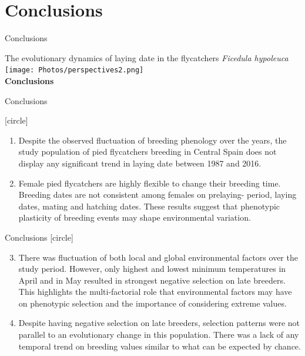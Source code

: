 \documentclass[compress]{beamer}
\begin{document}
\section{Conclusions}
\begin{frame}{Conclusions}

\centering
The evolutionary dynamics of laying date in the flycatchers \textit{Ficedula hypoleuca} \\
\vspace{0.5cm}
  \texttt{[image: Photos/perspectives2.png]} \\
\textbf{Conclusions}

\end{frame}

\begin{frame}{Conclusions}

     [circle]
 \begin{enumerate}
 \justifying
\item <1->Despite the observed fluctuation of breeding phenology over the years, the study population of pied flycatchers breeding in Central Spain does not display any significant trend in laying date between 1987 and 2016.
\vspace{0.3cm}

\item <2-> Female pied flycatchers are highly flexible to change their breeding time. Breeding dates are not consistent among females on prelaying- period, laying dates, mating and hatching dates. These results suggest that phenotypic plasticity
of breeding events may shape environmental variation.

\end{enumerate}
\end{frame}

\begin{frame}{Conclusions}
 [circle]
 \begin{enumerate}\setcounter{enumi}{2}
\item <1-> \justifying There was fluctuation of both local and global environmental factors over the study period. However, only highest and lowest minimum temperatures in April and in May resulted in strongest negative selection on late breeders.
This highlights the multi-factorial role that environmental factors may have on phenotypic selection and the importance of considering extreme values.
\vspace{0.3cm}
\item <2->Despite having negative selection on late breeders, selection patterns were not parallel to an evolutionary change in this population. There was a lack of any temporal trend on breeding values similar to what can be expected by chance.
\end{enumerate}
\end{frame}
\end{document}
